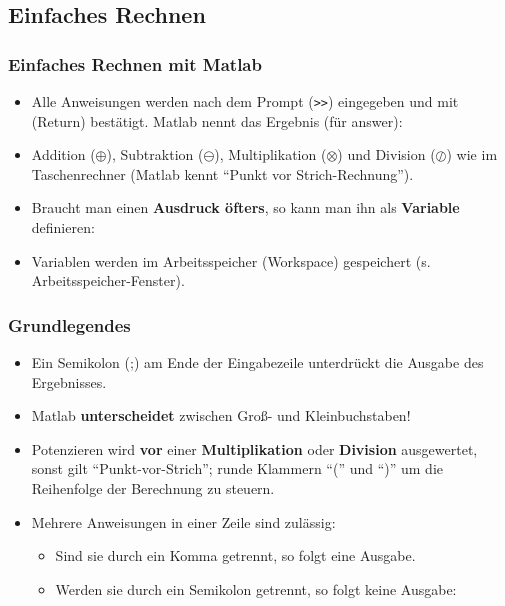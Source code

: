     \subsection{Einfaches Rechnen}
    \begin{frame}
      \frametitle{Einfaches Rechnen mit Matlab}
      \begin{itemize}
        \itemsep0.3cm
        \item Alle Anweisungen werden nach dem Prompt (\texttt{>>}) eingegeben und mit \keys{\return} (Return) bestätigt. Matlab nennt das Ergebnis  (für answer):

        \vspace{0.3cm}


        \item Addition ($\oplus$), Subtraktion ($\ominus$), Multiplikation ($\otimes$) und Division ($\oslash$) wie im Taschenrechner (Matlab kennt ``Punkt vor Strich-Rechnung'').
        \item Braucht man einen \textbf{Ausdruck öfters}, so kann man ihn als \textbf{Variable} definieren:

        \vspace{0.3cm}


        \item Variablen werden im Arbeitsspeicher (Workspace) gespeichert (s. Arbeitsspeicher-Fenster).
      \end{itemize}
    \end{frame}

    \begin{frame}
      \frametitle{Grundlegendes}
      \begin{itemize}
        \item Ein Semikolon (;) am Ende der Eingabezeile unterdrückt die Ausgabe des Ergebnisses.
        \item Matlab \textbf{unterscheidet} zwischen Groß- und Kleinbuchstaben!
        \item Potenzieren wird \textbf{vor} einer \textbf{Multiplikation} oder \textbf{Division} ausgewertet, sonst gilt ``Punkt-vor-Strich''; runde Klammern ``('' und ``)'' um die Reihenfolge der Berechnung zu steuern.
        \item Mehrere Anweisungen in einer Zeile sind zulässig:

        \begin{itemize}
          \item Sind sie durch ein Komma getrennt, so folgt eine Ausgabe.
          \item Werden sie durch ein Semikolon getrennt, so folgt keine Ausgabe:

          \vspace{0.3cm}


        \end{itemize}
      \end{itemize}
    \end{frame}

